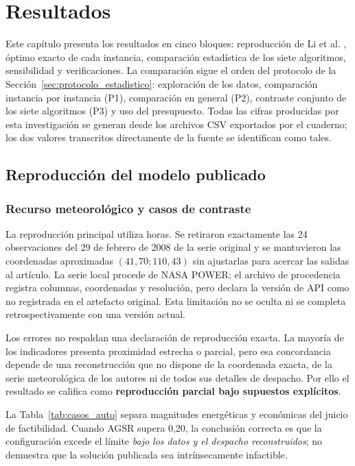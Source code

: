 \chapter{Resultados}

Este capítulo presenta los resultados en cinco bloques: reproducción de Li et al. \cite{Li2024WPEB}, óptimo exacto de cada instancia, comparación estadística de los siete algoritmos, sensibilidad y verificaciones. La comparación sigue el orden del protocolo de la Sección~\ref{sec:protocolo_estadistico}: exploración de los datos, comparación instancia por instancia (P1), comparación en general (P2), contraste conjunto de los siete algoritmos (P3) y uso del presupuesto. Todas las cifras producidas por esta investigación se generan desde los archivos CSV exportados por el cuaderno; los dos valores transcritos directamente de la fuente se identifican como tales.

\section{Reproducción del modelo publicado}
\label{sec:reproduccion}

\subsection{Recurso meteorológico y casos de contraste}

La reproducción principal utiliza \HoursMain{} horas. Se retiraron exactamente las 24 observaciones del 29 de febrero de 2008 de la serie original y se mantuvieron las coordenadas aproximadas $(41{,}70;110{,}43)$ sin ajustarlas para acercar las salidas al artículo. La serie local procede de NASA POWER; el archivo de procedencia registra columnas, coordenadas y resolución, pero declara la versión de API como no registrada en el artefacto original. Esta limitación no se oculta ni se completa retrospectivamente con una versión actual.

\TablaValidacionAuto

Los errores no respaldan una declaración de reproducción exacta. La mayoría de los indicadores presenta proximidad estrecha o parcial, pero esa concordancia depende de una reconstrucción que no dispone de la coordenada exacta, de la serie meteorológica de los autores ni de todos sus detalles de despacho. Por ello el resultado se califica como \textbf{reproducción parcial bajo supuestos explícitos}.

\TablaCasosAuto

La Tabla~\ref{tab:casos_auto} separa magnitudes energéticas y económicas del juicio de factibilidad. Cuando AGSR supera 0,20, la conclusión correcta es que la configuración excede el límite \emph{bajo los datos y el despacho reconstruidos}; no demuestra que la solución publicada sea intrínsecamente infactible.

